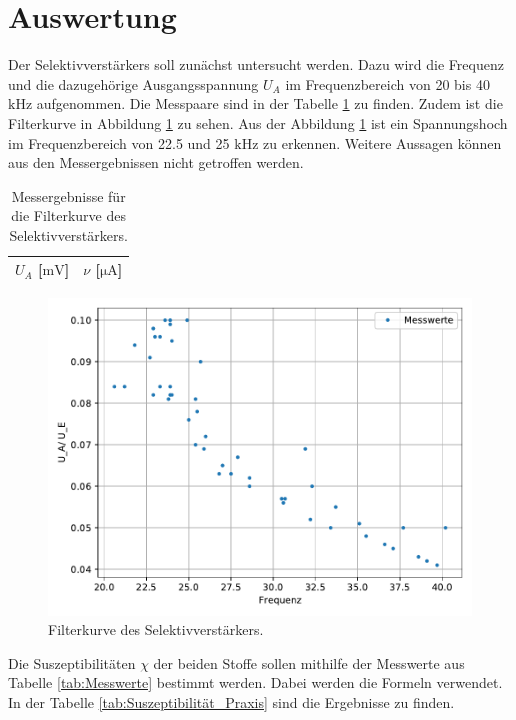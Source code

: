 \section{Auswertung}
\label{sec:Auswertung}
Der Selektivverstärkers soll zunächst untersucht werden.
Dazu wird die Frequenz und die dazugehörige Ausgangsspannung $U_A$ im Frequenzbereich von 20 bis 40 $\si{\kilo\hertz}$ aufgenommen.
Die Messpaare sind in der Tabelle \ref{tab:Messergebnisse} zu finden.
Zudem ist die Filterkurve in Abbildung \ref{fig:filterkurve} zu sehen.
Aus der Abbildung \ref{fig:filterkurve} ist ein Spannungshoch im Frequenzbereich von 22.5 und 25 $\si{\kilo\hertz}$ zu erkennen.
Weitere Aussagen können aus den Messergebnissen nicht getroffen werden.

\begin{table}
  \centering
  \caption{Messergebnisse für die Filterkurve des Selektivverstärkers.}
  \label{tab:Messergebnisse}
  \begin{tabular}{c c}
    \toprule
    {$U_A$ [$\si{\milli\volt}$]} & {$\nu$ [$\si{\micro\ampere}$]}\\
    \midrule
    
    \bottomrule
  \end{tabular}
\end{table}

\begin{figure}
  \centering
  \caption{Filterkurve des Selektivverstärkers.}
  \label{fig:filterkurve}
  \includegraphics{content/filterkurve.pdf}
\end{figure}

Die Suszeptibilitäten $\chi$ der beiden Stoffe sollen mithilfe der Messwerte aus Tabelle \ref{tab:Messwerte} bestimmt werden.
Dabei werden die Formeln verwendet.
In der Tabelle \ref{tab:Suszeptibilität_Praxis} sind die Ergebnisse zu finden.

